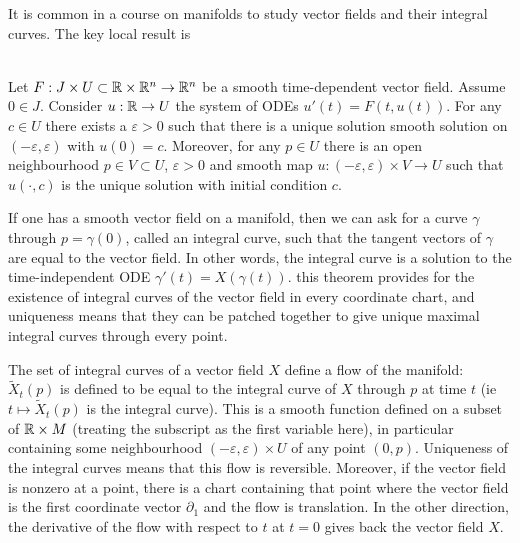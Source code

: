 It is common in a course on manifolds to study vector fields and their integral curves.
The key local result is
\begin{theorem}
\textup{\cite[Theorem~2.1.1]{Sharpe1997}}\cite[Theorem~1.2.1]{Ivey} \\
Let $F : J \times U \subset \mathbb{R}\times\mathbb{R}^n \to \mathbb{R}^n$ be a smooth time-dependent vector field. 
Assume $0 \in J$. 
Consider $u : \mathbb{R} \to U$ the system of ODEs $u'(t) = F(t,u(t))$.
For any $c \in U$ there exists a $\varepsilon > 0$ such that there is a unique solution smooth solution on $(-\varepsilon,\varepsilon)$ with $u(0) = c$.
Moreover, for any $p \in U$ there is an open neighbourhood $p \in V \subset U$, $\varepsilon > 0$ and smooth map $u : (-\varepsilon,\varepsilon) \times V \to U$ such that $u(\cdot,c)$ is the unique solution with initial condition $c$.
\end{theorem}

If one has a smooth vector field on a manifold, then we can ask for a curve $\gamma$ through $p = \gamma(0)$, called an integral curve, such that the tangent vectors of $\gamma$ are equal to the vector field.
In other words, the integral curve is a solution to the time-independent ODE $\gamma'(t) = X(\gamma(t))$.
this theorem provides for the existence of integral curves of the vector field in every coordinate chart, and uniqueness means that they can be patched together to give unique maximal integral curves through every point.

The set of integral curves of a vector field $X$ define a flow of the manifold: $\tilde{X}_t(p)$ is defined to be equal to the integral curve of $X$ through $p$ at time $t$ (ie $t \mapsto \tilde{X}_t(p)$ is the integral curve).
This is a smooth function defined on a subset of $\mathbb{R} \times M$ (treating the subscript as the first variable here), in particular containing some neighbourhood $(-\varepsilon,\varepsilon) \times U$ of any point $(0,p)$.
Uniqueness of the integral curves means that this flow is reversible.
Moreover, if the vector field is nonzero at a point, there is a chart containing that point where the vector field is the first coordinate vector $\partial_1$ and the flow is translation.
In the other direction, the derivative of the flow with respect to $t$ at $t=0$ gives back the vector field $X$.

